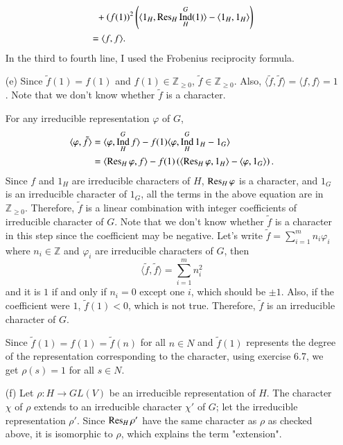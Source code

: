 \documentclass[a4paper, 12pt]{article}
\theoremstyle{Mydefinition}
\theoremstyle{Mytheorem}
\DeclareMathOperator{\Ind}{Ind}
\begin{document}
\begin{enumerate}
\begin{equation}
\begin{split}
        &\phantom{=}+\left(f(1)\right)^2\left(\langle 1_H, \Res_H\Ind_H^G(1)\rangle - \langle 1_H, 1_H\rangle\right)\\
        &=\langle f, f\rangle.
    \end{split}
    \end{equation}
    In the third to fourth line, I used the Frobenius reciprocity formula.
    \item[(e)] Since $\tilde{f}(1)=f(1)$ and $f(1)\in\mathbb{Z}_{\geq 0}$, $\tilde{f}\in \mathbb{Z}_{\geq 0}$. Also, $\langle \tilde{f}, \tilde{f}\rangle = \langle f, f\rangle = 1$. Note that we don't know whether $\tilde{f}$ is a character. 
    
    For any irreducible representation $\varphi$ of $G$,
    \begin{equation}
    \begin{split}
        \langle \varphi, \tilde{f}\rangle &= \langle \varphi, \Ind_H^G f\rangle  - f(1)\langle \varphi, \Ind_H^G 1_H - 1_G\rangle \\
        &=\langle \Res_H\varphi,  f\rangle  - f(1)\left(\langle \Res_H\varphi, 1_H\rangle - \langle \varphi, 1_G\rangle\right).
    \end{split}
    \end{equation}
    Since $f$ and $1_H$ are irreducible characters of $H$, $\Res_H \varphi$ is a character, and $1_G$ is an irreducible character of $1_G$, all the terms in the above equation are in $\mathbb{Z}_{\geq 0}$. Therefore, $\tilde{f}$ is a linear combination with integer coefficients of irreducible character of $G$. Note that we don't know whether $\tilde{f}$ is a character in this step since the coefficient may be negative. Let's write $\tilde{f} = \sum_{i=1}^m n_i \varphi_i$ where $n_i\in\mathbb{Z}$ and $\varphi_i$ are irreducible characters of $G$, then
    \begin{equation}
        \langle \tilde{f}, \tilde{f}\rangle = \sum_{i=1}^m n_i^2
    \end{equation}
    and it is $1$ if and only if $n_i=0$ except one $i$, which should be $\pm 1$. Also, if the coefficient were $1$, $\tilde{f}(1)<0$, which is not true. Therefore, $\tilde{f}$ is an irreducible character of $G$.
    
    Since $\tilde{f}(1) = f(1) = \tilde{f}(n)$ for all $n\in N$ and $\tilde{f}(1)$ represents the degree of the representation corresponding to the character, using exercise 6.7, we get $\rho(s) = 1$ for all $s\in N$.
    
    \item[(f)] Let $\rho:H\rightarrow GL(V)$ be an irreducible representation of $H$. The character $\chi$ of $\rho$ extends to an irreducible character $\chi'$ of $G$; let the irreducible representation $\rho'$. Since $\Res_H \rho'$ have the same character as $\rho$ as checked above, it is isomorphic to $\rho$, which explains the term "extension".
    

\end{enumerate}
\end{document}
